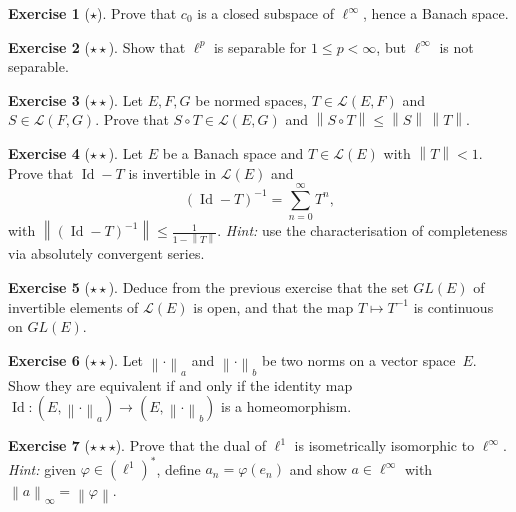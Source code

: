 \documentclass[a4paper,12pt]{book}
\DeclareMathOperator{\Id}{Id}
\newcommand{\norm}[1]{\left\| #1 \right\|}
\theoremstyle{definition}
\newtheorem{exercise}{Exercise}[chapter]
\theoremstyle{plain}
\theoremstyle{remark}
\begin{document}
\begin{exercise}[$\star$]
\label{exo:c0-closed}
Prove that $c_0$ is a closed subspace of $\ell^\infty$, hence a Banach
space.
\end{exercise}

\begin{exercise}[$\star\star$]
\label{exo:ell-p-separable}
Show that $\ell^p$ is separable for $1\le p<\infty$, but
$\ell^\infty$ is not separable.
\end{exercise}

\begin{exercise}[$\star\star$]
\label{exo:operator-norm-properties}
Let $E,F,G$ be normed spaces, $T\in\mathcal{L}(E,F)$ and
$S\in\mathcal{L}(F,G)$.  Prove that $S\circ T\in\mathcal{L}(E,G)$ and
$\norm{S\circ T}\le\norm{S}\,\norm{T}$.
\end{exercise}

\begin{exercise}[$\star\star$]
\label{exo:neumann-series}
Let $E$ be a Banach space and $T\in\mathcal{L}(E)$ with $\norm{T}<1$.
Prove that $\Id-T$ is invertible in $\mathcal{L}(E)$ and
\[
  (\Id-T)^{-1} = \sum_{n=0}^{\infty}T^n,
\]
with $\norm{(\Id-T)^{-1}}\le\frac{1}{1-\norm{T}}$.
\textit{Hint:} use the characterisation of completeness via absolutely
convergent series.
\end{exercise}

\begin{exercise}[$\star\star$]
\label{exo:GL-open}
Deduce from the previous exercise that the set $GL(E)$ of invertible
elements of $\mathcal{L}(E)$ is open, and that the map $T\mapsto T^{-1}$
is continuous on $GL(E)$.
\end{exercise}

\begin{exercise}[$\star\star$]
\label{exo:equivalent-norms-open-map}
Let $\norm{\cdot}_a$ and $\norm{\cdot}_b$ be two norms on a vector
space~$E$.  Show they are equivalent if and only if the identity map
$\Id:(E,\norm{\cdot}_a)\to(E,\norm{\cdot}_b)$ is a homeomorphism.
\end{exercise}

\begin{exercise}[$\star\star\star$]
\label{exo:ell-infty-dual}
Prove that the dual of $\ell^1$ is isometrically isomorphic to
$\ell^\infty$.  \textit{Hint:} given $\varphi\in(\ell^1)^*$, define
$a_n=\varphi(e_n)$ and show $a\in\ell^\infty$ with
$\norm{a}_\infty=\norm{\varphi}$.
\end{exercise}
\end{document}
